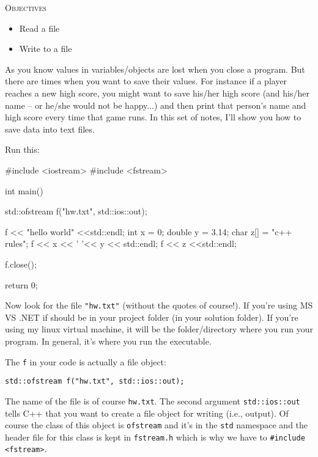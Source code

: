 \newpage{}

\textsc{Objectives}

\begin{itemize}
\item
  Read a file
\item
  Write to a file
\end{itemize}

As you know values in variables/objects are lost when you close a
program. But there are times when you want to save their values. For
instance if a player reaches a new high score, you might want to save
his/her high score (and his/her name -- or he/she would not be happy...)
and then print that person's name and high score every
time that game runs. In this set of notes, I'll show you
how to save data into text files.

\newpage{}

Run this:

\begin{console}
#include <iostream>
#include <fstream>

int main()
{   
    std::ofstream f("hw.txt", std::ios::out);

    f << "hello world" <<std::endl;
    int x = 0;
    double y = 3.14;
    char z[] = "c++ rules";
    f << x << ' '<< y << std::endl;
    f << z <<std::endl;

    f.close();

    return 0;
}
\end{console}

Now look for the file \texttt{"hw.txt"} (without the quotes of course!). If you're using MS VS .NET if should be in your project folder (in your solution folder). If you're using my linux virtual machine, it will be the folder/directory where you run your program. In general, it's where you run the executable.

The \texttt{f} in your code is actually a file object:

\begin{center}
\verb!std::ofstream f("hw.txt", std::ios::out);!
\end{center}

The name of the file is of course \texttt{hw.txt}. The second argument \texttt{std::ios::out} tells C++ that you want to create a file object for writing (i.e., output). Of course the class of this object is \texttt{ofstream} and it's in the \texttt{std} namespace and the header file for this class is kept in \texttt{fstream.h} which is why we have to \verb!#include <fstream>!.

